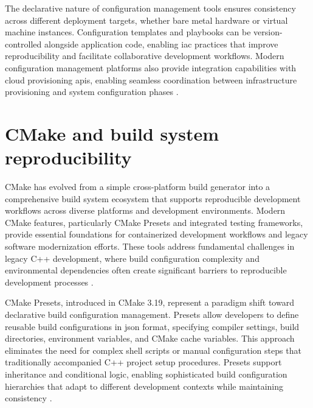 The declarative nature of configuration management tools ensures consistency across different deployment targets, whether bare metal hardware or virtual machine instances.
Configuration templates and playbooks can be version-controlled alongside application code, enabling \ac{iac} practices that improve reproducibility and facilitate collaborative development workflows.
Modern configuration management platforms also provide integration capabilities with cloud provisioning \acp{api}, enabling seamless coordination between infrastructure provisioning and system configuration phases \citep{humbleContinuousDeliveryReliable2011}.

\section{CMake and build system reproducibility}
CMake has evolved from a simple cross-platform build generator into a comprehensive build system ecosystem that supports reproducible development workflows across diverse platforms and development environments.
Modern CMake features, particularly CMake Presets and integrated testing frameworks, provide essential foundations for containerized development workflows and legacy software modernization efforts.
These tools address fundamental challenges in legacy C++ development, where build configuration complexity and environmental dependencies often create significant barriers to reproducible development processes \citep{swidzinskiModernCMakeEffortlessly2024}.

CMake Presets, introduced in CMake 3.19, represent a paradigm shift toward declarative build configuration management.
Presets allow developers to define reusable build configurations in \ac{json} format, specifying compiler settings, build directories, environment variables, and CMake cache variables.
This approach eliminates the need for complex shell scripts or manual configuration steps that traditionally accompanied C++ project setup procedures.
Presets support inheritance and conditional logic, enabling sophisticated build configuration hierarchies that adapt to different development contexts while maintaining consistency \citep{swidzinskiModernCMakeEffortlessly2024}.


